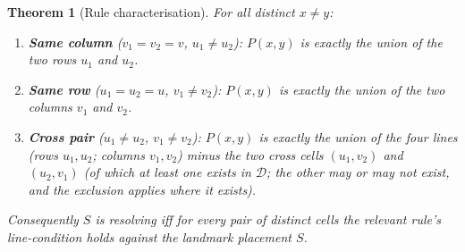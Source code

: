 \documentclass[12pt]{article}
\newtheorem{theorem}{Theorem}
\theoremstyle{definition}
\newcommand{\DD}{\mathcal{D}}
\newcommand{\RRc}{\ensuremath{\mathrm{(R\text{-}col)}}}
\newcommand{\RRr}{\ensuremath{\mathrm{(R\text{-}row)}}}
\newcommand{\RRx}{\ensuremath{\mathrm{(R\text{-}cross)}}}
\begin{document}
\begin{theorem}[Rule characterisation]\label{thm:rules}
For all distinct $x\neq y$:
\begin{enumerate}[label=\arabic*.,leftmargin=6mm,itemsep=2pt]
\item[\textup{\RRc{}}] \textbf{Same column} ($v_1=v_2=v$, $u_1\neq u_2$): $P(x,y)$ is exactly the union of the two rows $u_1$ and $u_2$.
\item[\textup{\RRr{}}] \textbf{Same row} ($u_1=u_2=u$, $v_1\neq v_2$): $P(x,y)$ is exactly the union of the two columns $v_1$ and $v_2$.
\item[\textup{\RRx{}}] \textbf{Cross pair} ($u_1\neq u_2$, $v_1\neq v_2$): $P(x,y)$ is exactly the union of the four lines (rows $u_1,u_2$; columns $v_1,v_2$) \emph{minus the two cross cells} $(u_1,v_2)$ and $(u_2,v_1)$ (of which at least one exists in $\DD$; the other may or may not exist, and the exclusion applies where it exists).
\end{enumerate}
Consequently $S$ is resolving \emph{iff} for every pair of distinct cells the relevant rule's line-condition holds against the landmark placement $S$.
\end{theorem}
\end{document}

